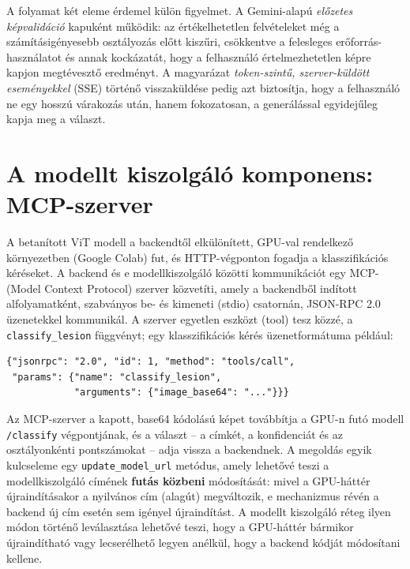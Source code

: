 A folyamat két eleme érdemel külön figyelmet. A Gemini-alapú \emph{előzetes
képvalidáció} kapuként működik: az értékelhetetlen felvételeket még a
számításigényesebb osztályozás előtt kiszűri, csökkentve a felesleges
erőforrás-használatot és annak kockázatát, hogy a felhasználó értelmezhetetlen
képre kapjon megtévesztő eredményt. A magyarázat \emph{token-szintű,
szerver-küldött eseményekkel} (SSE) történő visszaküldése pedig azt biztosítja,
hogy a felhasználó ne egy hosszú várakozás után, hanem fokozatosan, a
generálással egyidejűleg kapja meg a választ.

\section{A modellt kiszolgáló komponens: MCP-szerver}

A betanított ViT modell a backendtől elkülönített, GPU-val rendelkező
környezetben (Google Colab) fut, és HTTP-végponton fogadja a
klasszifikációs kéréseket. A backend és e modellkiszolgáló közötti
kommunikációt egy MCP- (Model Context Protocol) szerver \cite{mcp2024} közvetíti,
amely a backendből indított alfolyamatként, szabványos be- és kimeneti (stdio)
csatornán, JSON-RPC 2.0 üzenetekkel \cite{jsonrpc2013} kommunikál. A szerver
egyetlen eszközt (tool) tesz közzé, a \texttt{classify\_lesion} függvényt; egy
klasszifikációs kérés üzenetformátuma például:

\begin{verbatim}
{"jsonrpc": "2.0", "id": 1, "method": "tools/call",
 "params": {"name": "classify_lesion",
            "arguments": {"image_base64": "..."}}}
\end{verbatim}

Az MCP-szerver a kapott, base64 kódolású képet továbbítja a GPU-n futó modell
\texttt{/classify} végpontjának, és a választ -- a címkét, a konfidenciát és az
osztályonkénti pontszámokat -- adja vissza a backendnek. A megoldás egyik
kulcseleme egy \texttt{update\_model\_url} metódus, amely lehetővé teszi a
modellkiszolgáló címének \textbf{futás közbeni} módosítását: mivel a GPU-háttér
újraindításakor a nyilvános cím (alagút) megváltozik, e mechanizmus révén a
backend új cím esetén sem igényel újraindítást. A modellt kiszolgáló réteg
ilyen módon történő leválasztása lehetővé teszi, hogy a GPU-háttér bármikor
újraindítható vagy lecserélhető legyen anélkül, hogy a backend kódját módosítani
kellene.

